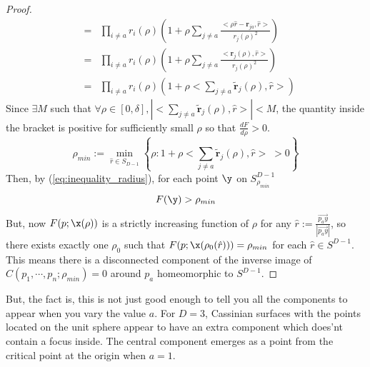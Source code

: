 \documentclass{article}
\begin{document}
\begin{proof}
\begin{eqnarray}
&=&\prod_{i \ne a } r_i(\rho) \left(1 + \rho\sum_{j\ne a } \frac{ <\rho\hat{r}-\mathbf{r}_{ja},\hat{r}>}{r_j(\rho)^2}\right)\nonumber\\
&=&\prod_{i \ne a } r_i(\rho) \left(1 + \rho\sum_{j\ne a } \frac{ <\mathbf{r}_{j}(\rho),\hat{r}>}{r_j(\rho)^2}\right) \nonumber\\
&=&\prod_{i \ne a } r_i(\rho) \left(1 +  \rho<\sum_{j\ne a }\mathbf{\tilde{r}}_{j}(\rho),\hat{r}> \right)
\end{eqnarray}
Since $\exists M$ such that $\forall \rho \in [0,\delta], |<\sum_{j\ne a }\mathbf{\tilde{r}}_{j}(\rho),\hat{r}>| < M$, the quantity inside the bracket is positive for sufficiently small $\rho$ so that $\frac{d F}{d \rho}>0$. 
\begin{equation}
\label{}
\rho_{min} := \min_{\hat{r}\in S_{D-1}}\left\{\rho: 1 +  \rho<\sum_{j\ne a }\mathbf{\tilde{r}}_{j}(\rho),\hat{r}> \; > 0 \right\}
\end{equation}
Then, by (\ref{eq:inequality_radius}), for each point $\y$ on $S^{D-1}_{\rho_{min}}$
\begin{equation}
\label{}
F(\y) > \rho_{min}
\end{equation}
But, now $F(p;\x(\rho))$ is a strictly increasing function of $\rho$ for any $\hat{r} := \frac{\overrightarrow{p_a y}}{|\overrightarrow{p_a y}|}$, so there exists exactly one $\rho_0$ such that $F(p;\x(\rho_0(\hat{r}))) = \rho_{min}$ for each $\hat{r} \in S^{D-1}$. This means there is a disconnected component of the inverse image of $C(p_1,\cdots,p_n;\rho_{min}) =0$ around $p_a$ homeomorphic to $S^{D-1}$.
\end{proof}
But, the fact is, this is not just good enough to tell you all the components to appear when you vary the value \(a\). For \(D=3\), Cassinian surfaces with the points located on the unit sphere appear to have an extra component which does'nt contain a focus inside. The central component emerges as a point from the critical point at the origin when \(a=1\).
\end{document}
